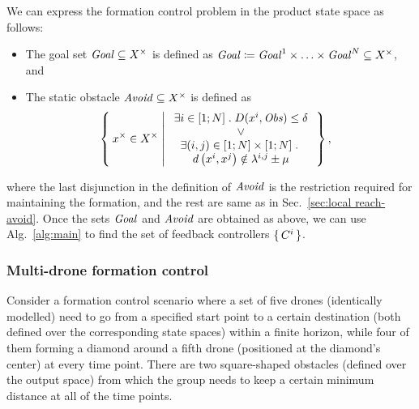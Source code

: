 We can express the formation control problem in the product state space as follows:
\begin{itemize}
	\item The goal set $\mathit{Goal}\subseteq X^\times$ is defined as $\mathit{Goal} \coloneqq \mathit{Goal}^1\times \ldots \times \mathit{Goal}^N \subseteq X^\times$, and
	\item The static obstacle $\mathit{Avoid}\subseteq X^\times$ is defined as 
		\begin{align}
			&\Set{ x^\times\in X^\times | 
				\begin{array}{c}
					\exists i\in [1;N]\;.\; D(x^i,\mathit{Obs}) \leq \delta\\
					\vee\\
					\exists (i,j)\in [1;N]\times [1;N]\;.\;\\ d\left(x^i,x^j\right)\notin\lambda^{i,j}\pm \mu
			\end{array}},					
		\end{align}
\end{itemize}
where the last disjunction in the definition of $\mathit{Avoid}$ is the restriction required for maintaining the formation, and the rest are same as in Sec.~\ref{sec:local reach-avoid}.
Once the sets $\mathit{Goal}$ and $\mathit{Avoid}$ are obtained as above, we can use Alg.~\ref{alg:main} to find the set of feedback controllers $\set{C^i}$.

\subsubsection{Multi-drone formation control}
\label{subsec:formation_control}
Consider a formation control scenario where a set of five drones (identically modelled) need to go from a specified start point to a certain destination (both defined over the corresponding state spaces) within a finite horizon, while four of them forming a diamond around a fifth drone (positioned at the diamond's center) at every time point. There are two square-shaped obstacles (defined over the output space) from which the group needs to keep a certain minimum distance at all of the time points. %

